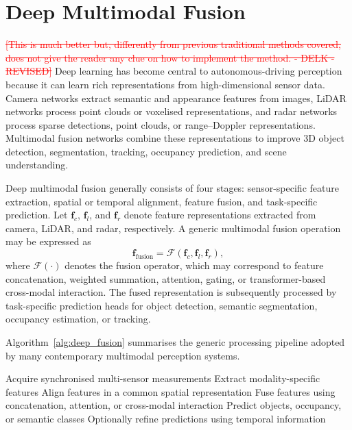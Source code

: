 \documentclass[11pt,oneside,openany]{book}
\newcommand{\deleted}[1]{\textcolor{red}{\sout{#1}}}
\begin{document}
\section{Deep Multimodal Fusion}
\deleted{[This is much better but, differently from previous traditional methods covered, does not give the reader any clue on how to implement the method. - DELK - REVISED]}
Deep learning has become central to autonomous-driving perception because it can learn rich representations from high-dimensional sensor data. Camera networks extract semantic and appearance features from images, LiDAR networks process point clouds or voxelised representations, and radar networks process sparse detections, point clouds, or range--Doppler representations. Multimodal fusion networks combine these representations to improve 3D object detection, segmentation, tracking, occupancy prediction, and scene understanding.

Deep multimodal fusion generally consists of four stages: sensor-specific feature extraction, spatial or temporal alignment, feature fusion, and task-specific prediction. Let $\mathbf{f}_c$, $\mathbf{f}_l$, and $\mathbf{f}_r$ denote feature representations extracted from camera, LiDAR, and radar, respectively. A generic multimodal fusion operation may be expressed as
\begin{equation}
\mathbf{f}_{\mathrm{fusion}}
=
\mathcal{F}
\left(
\mathbf{f}_c,
\mathbf{f}_l,
\mathbf{f}_r
\right),
\label{eq:deep_fusion}
\end{equation}
where $\mathcal{F}(\cdot)$ denotes the fusion operator, which may correspond to feature concatenation, weighted summation, attention, gating, or transformer-based cross-modal interaction. The fused representation is subsequently processed by task-specific prediction heads for object detection, semantic segmentation, occupancy estimation, or tracking.

Algorithm~\ref{alg:deep_fusion} summarises the generic processing pipeline adopted by many contemporary multimodal perception systems.

\begin{algorithm}[t]
\caption{Generic Deep Multimodal Fusion Pipeline}
\label{alg:deep_fusion}
\begin{algorithmic}[1]
\State Acquire synchronised multi-sensor measurements
\State Extract modality-specific features
\State Align features in a common spatial representation
\State Fuse features using concatenation, attention, or cross-modal interaction
\State Predict objects, occupancy, or semantic classes
\State Optionally refine predictions using temporal information
\end{algorithmic}
\end{algorithm}
\end{document}
